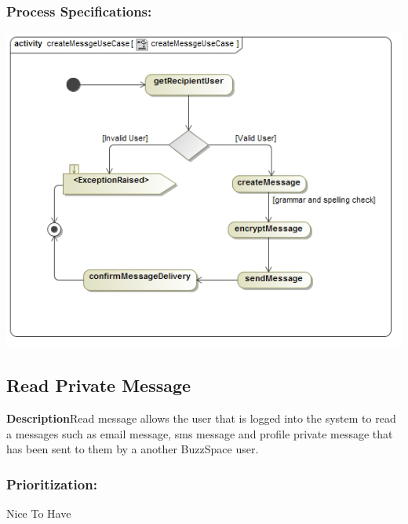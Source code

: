 \documentclass[a4paper,11pt]{article}
\begin{document}
\subsubsection{Process Specifications:} 
\includegraphics[width=1\linewidth]{./Images/PrivateMessage/createMessgeActivity}

\subsection{Read Private Message}
\textbf{Description}Read message allows the user that is logged into the system to read a messages such as email message, sms message and profile private message that has been sent to them by a another BuzzSpace user.
\subsubsection{Prioritization:} 
\textbf{}Nice To Have
\end{document}
